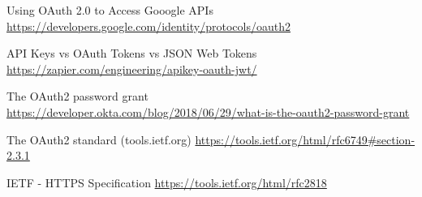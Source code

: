 \begin{thebibliography}{9}
    Using OAuth 2.0 to Access Gooogle APIs
    \\
    \url{https://developers.google.com/identity/protocols/oauth2}

    API Keys vs OAuth Tokens vs JSON Web Tokens
    \\
    \url{https://zapier.com/engineering/apikey-oauth-jwt/}

    The OAuth2 password grant
    \\
    \url{https://developer.okta.com/blog/2018/06/29/what-is-the-oauth2-password-grant}

    The OAuth2 standard (tools.ietf.org)
    \url{https://tools.ietf.org/html/rfc6749#section-2.3.1}

    IETF - HTTPS Specification
    \url{https://tools.ietf.org/html/rfc2818}
\end{thebibliography}
